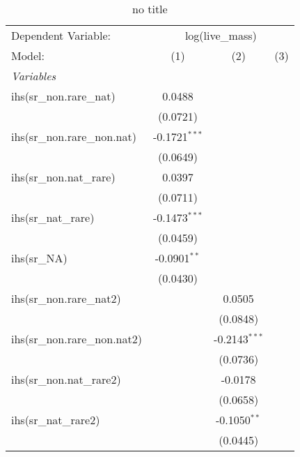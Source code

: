 
\begin{table}[htbp]
   \caption{no title}
   \centering
   \begin{tabular}{lccc}
      \tabularnewline \midrule \midrule
      Dependent Variable: & \multicolumn{3}{c}{log(live\_mass)}\\
      Model:                        & (1)             & (2)             & (3)\\  
      \midrule
      \emph{Variables}\\
      ihs(sr\_non.rare\_nat)        & 0.0488          &                 &   \\   
                                    & (0.0721)        &                 &   \\   
      ihs(sr\_non.rare\_non.nat)    & -0.1721$^{***}$ &                 &   \\   
                                    & (0.0649)        &                 &   \\   
      ihs(sr\_non.nat\_rare)        & 0.0397          &                 &   \\   
                                    & (0.0711)        &                 &   \\   
      ihs(sr\_nat\_rare)            & -0.1473$^{***}$ &                 &   \\   
                                    & (0.0459)        &                 &   \\   
      ihs(sr\_NA)                   & -0.0901$^{**}$  &                 &   \\   
                                    & (0.0430)        &                 &   \\   
      ihs(sr\_non.rare\_nat2)       &                 & 0.0505          &   \\   
                                    &                 & (0.0848)        &   \\   
      ihs(sr\_non.rare\_non.nat2)   &                 & -0.2143$^{***}$ &   \\   
                                    &                 & (0.0736)        &   \\   
      ihs(sr\_non.nat\_rare2)       &                 & -0.0178         &   \\   
                                    &                 & (0.0658)        &   \\   
      ihs(sr\_nat\_rare2)           &                 & -0.1050$^{**}$  &   \\   
                                    &                 & (0.0445)        &   \\   

\end{tabular}
\end{table}
